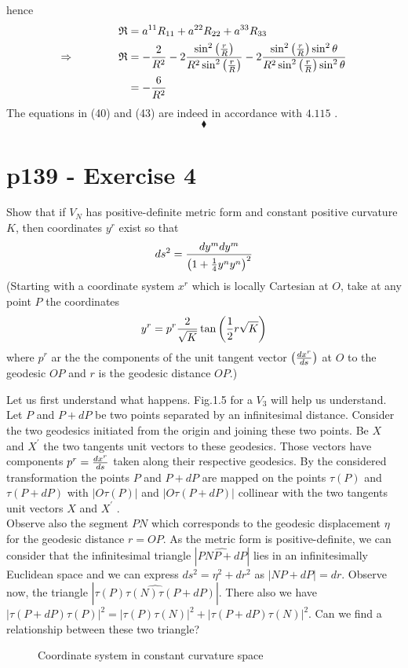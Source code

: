 hence
\begin{align}
\mathfrak{R}&=a^{11}R_{11}+a^{22}R_{22}+a^{33}R_{33}\\
\Rightarrow\quad\quad\quad\quad \mathfrak{R}&= -\frac{2}{R^2}-2\frac{\sin^2\left(\frac{r}{R}\right)}{R^2\sin^2\left(\frac{r}{R}\right)}-2\frac{\sin^2\left(\frac{r}{R}\right)\sin^2\theta}{R^2\sin^2\left(\frac{r}{R}\right)\sin^2\theta }\\
&= -\frac{6}{R^2}
\end{align}
The equations in (40) and (43) are indeed in accordance with $\mathbf{4.115}$ .
$$\blacklozenge$$
\newpage

\section{p139 - Exercise 4}
\begin{tcolorbox}
Show that if $V_N$ has positive-definite metric form and constant positive curvature $K$, then coordinates $y^r$ exist so that
$$ds^2=\frac{dy^m dy^m}{\left(1+\frac{1}{4} y^n y^n\right)^2}$$
(Starting with a coordinate system $x^r$ which is locally Cartesian at $O$, take at any point $P$ the coordinates
$$y^r=p^r\frac{2}{\sqrt{K}}\tan\left(\frac{1}{2} r \sqrt{K}\right)$$
where $p^r$ ar the the components of the unit tangent vector $\left(\dv{x^r}{s}\right)$ at $O$ to the geodesic $OP$ and $r$ is the geodesic distance $OP$.)
\end{tcolorbox}
Let us first understand what happens. Fig.1.5 for a $V_3$ will help us understand.
Let $P$ and $P+dP$ be two points separated by an infinitesimal distance. Consider the two geodesics initiated from the origin and joining these two points. Be $X$ and $X^{'}$ the two tangents unit vectors  to these geodesics. Those vectors have components $p^r=\dv{x^r}{s}$ taken along their respective geodesics.  By the considered transformation the points $P$ and $P+dP$ are mapped on the  points  $\tau (P)$ and $\tau (P+dP)$ with $\left|O\tau (P)\right|$ and $\left|O\tau (P+dP)\right|$ collinear with the  two tangents unit vectors  $X$ and $X^{'}$ . \\
Observe also the segment $PN$ which corresponds to the geodesic displacement $\eta$ for the geodesic distance $r=OP$. As the metric form is positive-definite, we can consider that the infinitesimal triangle $\left|\widehat{PNP+dP}\right|$ lies in an infinitesimally Euclidean space and  we can express $ds^2=\eta^2+ dr^2$ as $\left|NP+dP\right| = dr$. Observe now, the triangle $\left|\widehat{\tau(P)\tau(N)\tau(P+dP)}\right|$. There also we have $\left|\tau(P+dP)\tau(P)\right|^2 = \left|\tau(P)\tau(N)\right|^2+\left|\tau(P+dP)\tau(N)\right|^2$. Can we find a relationship between these two triangle?\\
\begin{figure}[H]
\begin{center}

\caption{Coordinate system in constant curvature space}
\label{fig:fig_p139_Ex4}
\end{center}
\end{figure}

